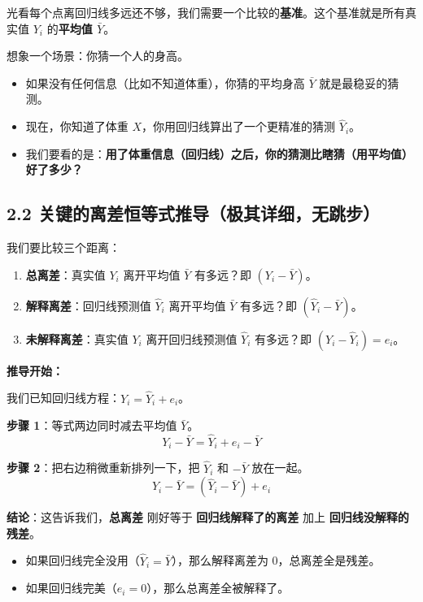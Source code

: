 \documentclass[12pt,a4paper]{article}
\begin{document}
光看每个点离回归线多远还不够，我们需要一个比较的\textbf{基准}。这个基准就是所有真实值 \(Y_i\) 的\textbf{平均值 \(\bar{Y}\)}。

想象一个场景：你猜一个人的身高。
\begin{itemize}[itemsep=0pt,topsep=0pt]
    \item 如果没有任何信息（比如不知道体重），你猜的平均身高 \(\bar{Y}\) 就是最稳妥的猜测。
    \item 现在，你知道了体重 \(X\)，你用回归线算出了一个更精准的猜测 \(\hat{Y}_i\)。
    \item 我们要看的是：\textbf{用了体重信息（回归线）之后，你的猜测比瞎猜（用平均值）好了多少？}
\end{itemize}

\subsection*{2.2 关键的离差恒等式推导（极其详细，无跳步）}

我们要比较三个距离：
\begin{enumerate}[itemsep=0pt,topsep=0pt,label=(\arabic*)]
    \item \textbf{总离差}：真实值 \(Y_i\) 离开平均值 \(\bar{Y}\) 有多远？即 \((Y_i - \bar{Y})\)。
    \item \textbf{解释离差}：回归线预测值 \(\hat{Y}_i\) 离开平均值 \(\bar{Y}\) 有多远？即 \((\hat{Y}_i - \bar{Y})\)。
    \item \textbf{未解释离差}：真实值 \(Y_i\) 离开回归线预测值 \(\hat{Y}_i\) 有多远？即 \((Y_i - \hat{Y}_i) = e_i\)。
\end{enumerate}

\textbf{推导开始：}

我们已知回归线方程：\(Y_i = \hat{Y}_i + e_i\)。

\textbf{步骤 1}：等式两边同时减去平均值 \(\bar{Y}\)。
\[
Y_i - \bar{Y} = \hat{Y}_i + e_i - \bar{Y}
\]

\textbf{步骤 2}：把右边稍微重新排列一下，把 \(\hat{Y}_i\) 和 \(-\bar{Y}\) 放在一起。
\begin{equation}
    Y_i - \bar{Y} = (\hat{Y}_i - \bar{Y}) + e_i
\end{equation}

\textbf{结论}：这告诉我们，\textbf{总离差} 刚好等于 \textbf{回归线解释了的离差} 加上 \textbf{回归线没解释的残差}。
\begin{itemize}[itemsep=0pt,topsep=0pt]
    \item 如果回归线完全没用（\(\hat{Y}_i = \bar{Y}\)），那么解释离差为 0，总离差全是残差。
    \item 如果回归线完美（\(e_i = 0\)），那么总离差全被解释了。
\end{itemize}
\end{document}
